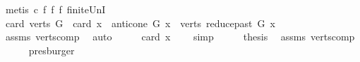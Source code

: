 \begin{isabellebody}
\ {\isacharparenleft}{\kern0pt}metis\ c{}\ f{}\ f{}\ f{}\ finite{\isacharunderscore}{\kern0pt}UnI{\isacharparenright}{\kern0pt}\ \isanewline
\ \ \isamarkupfalse%
\ \isamarkupfalse%
\ {\isachardoublequoteopen}card\ {\isacharparenleft}{\kern0pt}verts\ G{\isacharparenright}{\kern0pt}\ {\isacharequal}{\kern0pt}\ card\ {\isacharparenleft}{\kern0pt}{\isacharbraceleft}{\kern0pt}x{\isacharbraceright}{\kern0pt}\ {\isasymunion}\ {\isacharparenleft}{\kern0pt}anticone\ G\ x{\isacharparenright}{\kern0pt}\ {\isasymunion}\ verts\ {\isacharparenleft}{\kern0pt}reduce{\isacharunderscore}{\kern0pt}past\ G\ x{\isacharparenright}{\kern0pt}{\isacharparenright}{\kern0pt}{\isachardoublequoteclose}\isanewline
\ \ \ \ \isamarkupfalse%
\ assms\ verts{\isacharunderscore}{\kern0pt}comp\ \isamarkupfalse%
\ auto\isanewline
\ \ \isamarkupfalse%
\ \isamarkupfalse%
\ {\isachardoublequoteopen}card\ {\isacharbraceleft}{\kern0pt}x{\isacharbraceright}{\kern0pt}\ {\isacharequal}{\kern0pt}\ {}{\isachardoublequoteclose}\ \isamarkupfalse%
\ simp\isanewline
\ \ \isamarkupfalse%
\ \isamarkupfalse%
\ {\isacharquery}{\kern0pt}thesis\ \isamarkupfalse%
\ assms\ verts{\isacharunderscore}{\kern0pt}comp\isanewline
\ \ \ \ \isamarkupfalse%
\ presburger\ \ \isanewline
{}\isamarkupfalse%
%
\endisatagproof
{\isafoldproof}%
%
\isadelimproof
\isanewline
%
\endisadelimproof
%
\isadelimtheory
\isanewline
%
\endisadelimtheory
%
\isatagtheory
{}\isamarkupfalse%
%
\endisatagtheory
{\isafoldtheory}%
%
\isadelimtheory
%
\endisadelimtheory
%
\end{isabellebody}%
\endinput
